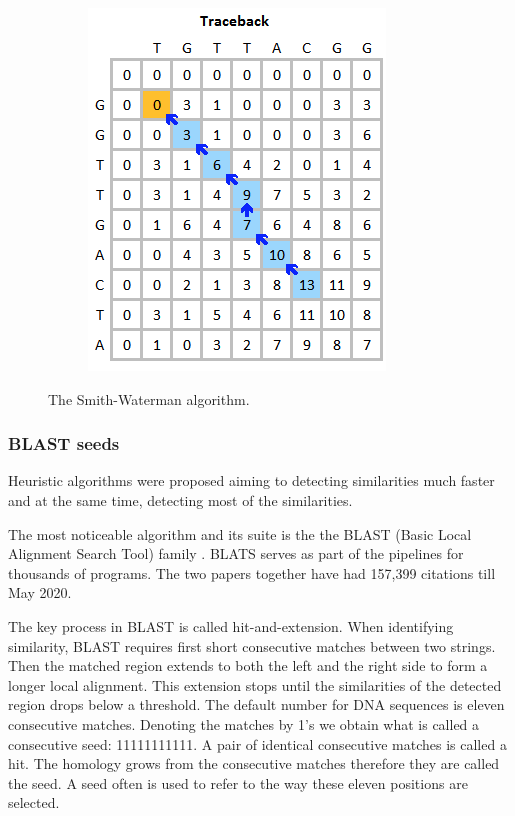 \begin{figure}[h!]
\begin{subfigure}[b]{0.45\textwidth}
         \includegraphics[width=\textwidth]{img/Smith_waterman_backtra.png}
     \end{subfigure}
        \caption[The Smith-Waterman algorithm.]{The Smith-Waterman algorithm.}
        \label{fig_smith_waterman}
\end{figure}

\subsubsection{BLAST seeds}
Heuristic algorithms were proposed aiming to detecting similarities much faster and at the same time, detecting most of the similarities.

The most noticeable algorithm and its suite is the the BLAST (Basic Local Alignment Search Tool) family \cite{Altschul90_BLAST, altschul1997PSI_BLAST}. BLATS serves as part of the pipelines for thousands of programs. The two papers together have had 157,399 citations till May 2020. 

The key process in BLAST is called hit-and-extension. When identifying similarity, BLAST requires first short consecutive matches between two strings. Then the matched region extends to both the left and the right side to form a longer local alignment. This extension stops until the similarities of the detected region drops below a threshold. The default number for DNA sequences is eleven consecutive matches. Denoting the matches by 1's we obtain what is called a consecutive seed: 11111111111. A pair of identical consecutive matches is called a hit. The homology grows from the consecutive matches therefore they are called the seed. A seed often is used to refer to the way these eleven positions are selected.

